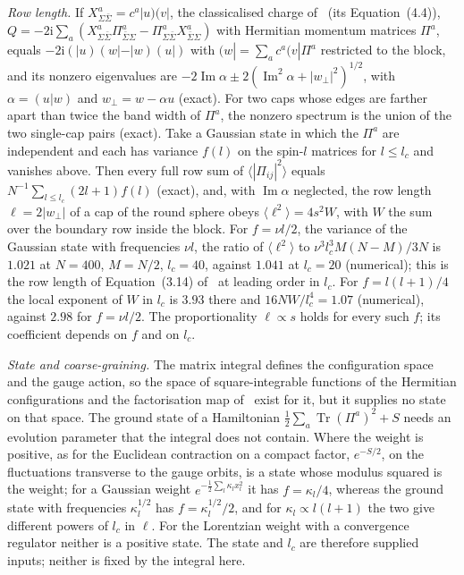 \emph{Row length.} If \(X^a_{\Sigma\bar\Sigma}=c^a|u)(v|\), the classicalised charge of~\cite{FlissFrenkelHartnollSoni2025} (its Equation~(4.4)), \(Q=-2\mathrm i\sum_a(X^a_{\Sigma\bar\Sigma}\Pi^a_{\bar\Sigma\Sigma}-\Pi^a_{\Sigma\bar\Sigma}X^a_{\bar\Sigma\Sigma})\) with Hermitian momentum matrices \(\Pi^a\), equals \(-2\mathrm i(|u)(w|-|w)(u|)\) with \((w|=\sum_ac^a(v|\Pi^a\) restricted to the block, and its nonzero eigenvalues are \(-2\operatorname{Im}\alpha\pm2(\operatorname{Im}^2\alpha+|w_\perp|^2)^{1/2}\), with \(\alpha=(u|w)\) and \(w_\perp=w-\alpha u\) (exact). For two caps whose edges are farther apart than twice the band width of \(\Pi^a\), the nonzero spectrum is the union of the two single-cap pairs (exact). Take a Gaussian state in which the \(\Pi^a\) are independent and each has variance \(f(l)\) on the spin-\(l\) matrices for \(l\le l_c\) and vanishes above. Then every full row sum of \(\langle|\Pi_{ij}|^2\rangle\) equals \(N^{-1}\sum_{l\le l_c}(2l+1)f(l)\) (exact), and, with \(\operatorname{Im}\alpha\) neglected, the row length \(\ell=2|w_\perp|\) of a cap of the round sphere obeys \(\langle\ell^2\rangle=4s^2W\), with \(W\) the sum over the boundary row inside the block. For \(f=\nu l/2\), the variance of the Gaussian state with frequencies \(\nu l\), the ratio of \(\langle\ell^2\rangle\) to \(\nu^3l_c^3M(N-M)/3N\) is \(1.021\) at \(N=400\), \(M=N/2\), \(l_c=40\), against \(1.041\) at \(l_c=20\) (numerical); this is the row length of Equation~(3.14) of~\cite{FlissFrenkelHartnollSoni2025} at leading order in \(l_c\). For \(f=l(l+1)/4\) the local exponent of \(W\) in \(l_c\) is \(3.93\) there and \(16NW/l_c^4=1.07\) (numerical), against \(2.98\) for \(f=\nu l/2\). The proportionality \(\ell\propto s\) holds for every such \(f\); its coefficient depends on \(f\) and on \(l_c\).

\emph{State and coarse-graining.} The matrix integral defines the configuration space and the gauge action, so the space of square-integrable functions of the Hermitian configurations and the factorisation map of~\cite{FlissFrenkelHartnollSoni2025} exist for it, but it supplies no state on that space. The ground state of a Hamiltonian \(\tfrac12\sum_a\operatorname{Tr}(\Pi^a)^2+S\) needs an evolution parameter that the integral does not contain. Where the weight is positive, as for the Euclidean contraction on a compact factor, \(e^{-S/2}\), on the fluctuations transverse to the gauge orbits, is a state whose modulus squared is the weight; for a Gaussian weight \(e^{-\frac12\sum_l\kappa_lx_l^2}\) it has \(f=\kappa_l/4\), whereas the ground state with frequencies \(\kappa_l^{1/2}\) has \(f=\kappa_l^{1/2}/2\), and for \(\kappa_l\propto l(l+1)\) the two give different powers of \(l_c\) in \(\ell\). For the Lorentzian weight with a convergence regulator neither is a positive state. The state and \(l_c\) are therefore supplied inputs; neither is fixed by the integral here.

